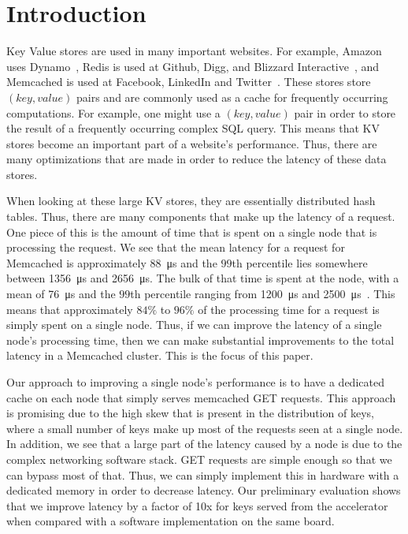 \section{Introduction}
Key Value stores are used in many important websites. For example, Amazon uses
Dynamo~\cite{dynamo}, Redis is used at Github, Digg, and Blizzard
Interactive~\cite{Reddi10}, and Memcached is used at Facebook, LinkedIn and
Twitter~\cite{memcached, Petrovic08}. These stores store $(key, value)$ pairs and are
commonly used as a cache for frequently occurring computations. For example,
one might use a $(key, value)$ pair in order to store the result of a
frequently occurring complex SQL query. This means that KV stores become an
important part of a website's performance. Thus, there are many optimizations
that are made in order to reduce the latency of these data stores.

When looking at these large KV stores, they are essentially distributed hash
tables. Thus, there are many components that make up the latency of a request.
One piece of this is the amount of time that is spent on a single node that is
processing the request. We see that the mean latency for a request for
Memcached is approximately \SI{88}{\micro\s} and the $99$th percentile lies
somewhere between \SI{1356}{\micro\s} and \SI{2656}{\micro\s}.  The bulk
of that time is spent at the node, with a mean of \SI{76}{\micro\s} and
the $99$th percentile ranging from \SI{1200}{\micro\s} and
\SI{2500}{\micro\s}~\cite{Kapoor2012}.  This means that approximately
$84\%$ to $96\%$ of the processing time for a request is simply spent on a
single node. Thus, if we can improve the latency of a single node's processing
time, then we can make substantial improvements to the total latency in a
Memcached cluster. This is the focus of this paper.

Our approach to improving a single node's performance is to have a dedicated
cache on each node that simply serves memcached GET requests. This approach is
promising due to the high skew that is present in the distribution of keys,
where a small number of keys make up most of the requests seen at a single
node. In addition, we see that a large part of the latency caused by a node is
due to the complex networking software stack. GET requests are simple enough so
that we can bypass most of that. Thus, we can simply implement this in hardware
with a dedicated memory in order to decrease latency. Our preliminary
evaluation shows that we improve latency by a factor of 10x for keys served
from the accelerator when compared with a software implementation on the same
board.
